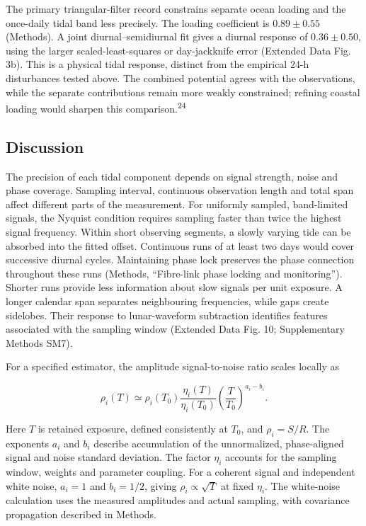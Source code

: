 \documentclass[
  11pt,
  a4paper,
]{article}
\begin{document}
The primary triangular-filter record constrains separate ocean loading
and the once-daily tidal band less precisely. The loading coefficient is
\(0.89\pm0.55\) (Methods). A joint diurnal--semidiurnal fit gives a
diurnal response of \(0.36\pm0.50\), using the larger
scaled-least-squares or day-jackknife error (Extended Data Fig. 3b).
This is a physical tidal response, distinct from the empirical 24-h
disturbances tested above. The combined potential agrees with the
observations, while the separate contributions remain more weakly
constrained; refining coastal loading would sharpen this
comparison.\textsuperscript{24}

\hypertarget{discussion}{%
\subsection{Discussion}\label{discussion}}

The precision of each tidal component depends on signal strength, noise
and phase coverage. Sampling interval, continuous observation length and
total span affect different parts of the measurement. For uniformly
sampled, band-limited signals, the Nyquist condition requires sampling
faster than twice the highest signal frequency. Within short observing
segments, a slowly varying tide can be absorbed into the fitted offset.
Continuous runs of at least two days would cover successive diurnal
cycles. Maintaining phase lock preserves the phase connection throughout
these runs (Methods, ``Fibre-link phase locking and monitoring'').
Shorter runs provide less information about slow signals per unit
exposure. A longer calendar span separates neighbouring frequencies,
while gaps create sidelobes. Their response to lunar-waveform
subtraction identifies features associated with the sampling window
(Extended Data Fig. 10; Supplementary Methods SM7).

For a specified estimator, the amplitude signal-to-noise ratio scales
locally as

\[
\rho_i(T)\simeq\rho_i(T_0)
\frac{\eta_i(T)}{\eta_i(T_0)}
\left(\frac{T}{T_0}\right)^{a_i-b_i}.\tag{1}
\]

Here \(T\) is retained exposure, defined consistently at \(T_0\), and
\(\rho_i=S/R\). The exponents \(a_i\) and \(b_i\) describe accumulation
of the unnormalized, phase-aligned signal and noise standard deviation.
The factor \(\eta_i\) accounts for the sampling window, weights and
parameter coupling. For a coherent signal and independent white noise,
\(a_i=1\) and \(b_i=1/2\), giving \(\rho_i\propto\sqrt{T}\) at fixed
\(\eta_i\). The white-noise calculation uses the measured amplitudes and
actual sampling, with covariance propagation described in Methods.
\end{document}
